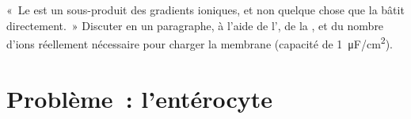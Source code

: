 \begin{exercise}[$\star\star\star$]\label{exo:b1:membranes-transport:12}
«~Le  est un sous-produit des gradients ioniques,
et non quelque chose que la  bâtit directement.~» Discuter en un
paragraphe, à l'aide de l', de la , et du nombre
d'ions réellement nécessaire pour charger la membrane (capacité de
\qty{1}{\micro F/cm^2}).
\end{exercise}

\section{Problème~: l'entérocyte}

